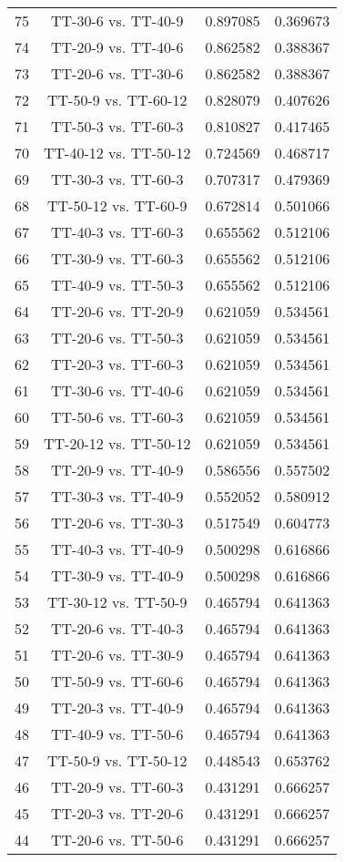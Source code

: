 \documentclass[a4paper,10pt]{article}
\begin{document}
\begin{landscape}
\begin{table}[!htp]
\begin{tabular}{cccc}
75&TT-30-6 vs. TT-40-9&0.897085&0.369673\\
74&TT-20-9 vs. TT-40-6&0.862582&0.388367\\
73&TT-20-6 vs. TT-30-6&0.862582&0.388367\\
72&TT-50-9 vs. TT-60-12&0.828079&0.407626\\
71&TT-50-3 vs. TT-60-3&0.810827&0.417465\\
70&TT-40-12 vs. TT-50-12&0.724569&0.468717\\
69&TT-30-3 vs. TT-60-3&0.707317&0.479369\\
68&TT-50-12 vs. TT-60-9&0.672814&0.501066\\
67&TT-40-3 vs. TT-60-3&0.655562&0.512106\\
66&TT-30-9 vs. TT-60-3&0.655562&0.512106\\
65&TT-40-9 vs. TT-50-3&0.655562&0.512106\\
64&TT-20-6 vs. TT-20-9&0.621059&0.534561\\
63&TT-20-6 vs. TT-50-3&0.621059&0.534561\\
62&TT-20-3 vs. TT-60-3&0.621059&0.534561\\
61&TT-30-6 vs. TT-40-6&0.621059&0.534561\\
60&TT-50-6 vs. TT-60-3&0.621059&0.534561\\
59&TT-20-12 vs. TT-50-12&0.621059&0.534561\\
58&TT-20-9 vs. TT-40-9&0.586556&0.557502\\
57&TT-30-3 vs. TT-40-9&0.552052&0.580912\\
56&TT-20-6 vs. TT-30-3&0.517549&0.604773\\
55&TT-40-3 vs. TT-40-9&0.500298&0.616866\\
54&TT-30-9 vs. TT-40-9&0.500298&0.616866\\
53&TT-30-12 vs. TT-50-9&0.465794&0.641363\\
52&TT-20-6 vs. TT-40-3&0.465794&0.641363\\
51&TT-20-6 vs. TT-30-9&0.465794&0.641363\\
50&TT-50-9 vs. TT-60-6&0.465794&0.641363\\
49&TT-20-3 vs. TT-40-9&0.465794&0.641363\\
48&TT-40-9 vs. TT-50-6&0.465794&0.641363\\
47&TT-50-9 vs. TT-50-12&0.448543&0.653762\\
46&TT-20-9 vs. TT-60-3&0.431291&0.666257\\
45&TT-20-3 vs. TT-20-6&0.431291&0.666257\\
44&TT-20-6 vs. TT-50-6&0.431291&0.666257\\

\end{tabular}
\end{table}
\end{landscape}
\end{document}
